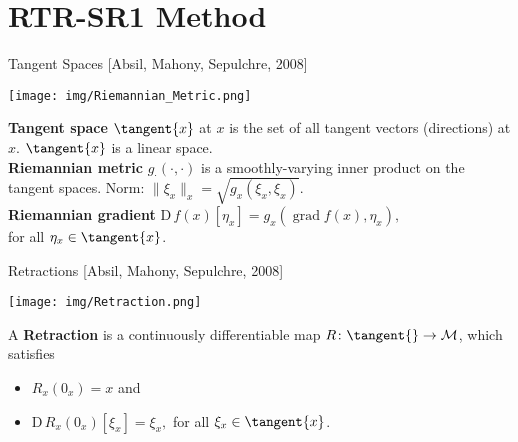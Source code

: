 \documentclass{beamer}
\begin{document}
\section{RTR-SR1 Method}

\begin{frame}{Tangent Spaces}
    \vspace{-0.5\baselineskip}\hfill{\tiny{[Absil, Mahony, Sepulchre, 2008]}}
    \begin{center}
        \texttt{[image: img/Riemannian\_Metric.png]}
    \end{center}
    \textbf{Tangent space} $\tangent{x}$ at $x$ is the set of all tangent vectors (directions) at $x$. $\tangent{x}$ is a linear space. \\[0.2\baselineskip]
    \textbf{Riemannian metric} $g_{\cdot} (\cdot, \cdot)$ is a smoothly-varying inner product on the tangent spaces. Norm: $\lVert \xi_x \rVert_x = \sqrt{g_x(\xi_x, \xi_x)}$. \\[0.2\baselineskip]
    \textbf{Riemannian gradient} $\mathrm{D} \, f(x) [\eta_x] = g_x (\operatorname{grad} f(x), \eta_x),$ \\
    for all $\eta_x \in \tangent{x}$.
\end{frame}

\begin{frame}{Retractions}
    \vspace{-0.5\baselineskip}\hfill{\tiny{[Absil, Mahony, Sepulchre, 2008]}}
    \begin{center}
        \texttt{[image: img/Retraction.png]}
    \end{center}
    A \textbf{Retraction} is a continuously differentiable map $R \colon \tangent{} \to \mathcal{M}$, which satisfies \\[-0.1\baselineskip]
    \begin{itemize}
        \item $R_x (0_x) = x$ and
        \item $\mathrm{D} \, R_x (0_x)[\xi_x] = \xi_x,$ for all $\xi_x \in \tangent{x}$.
    \end{itemize}
\end{frame}
\end{document}
